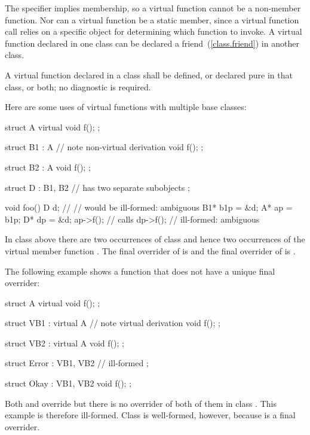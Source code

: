 \pnum
\begin{note}
The  specifier implies membership, so a virtual function
cannot be a non-member function. Nor can a virtual
function be a static member, since a virtual function call relies on a
specific object for determining which function to invoke. A virtual
function declared in one class can be declared a friend~(\ref{class.friend}) in
another class.
\end{note}

\pnum
{}%
A virtual function declared in a class shall be defined, or declared
pure in that class, or both; no diagnostic is
required.
%

\pnum
{}%
\begin{example}
Here are some uses of virtual functions with multiple base classes:
\begin{codeblock}
struct A {
  virtual void f();
};

struct B1 : A {                 // note non-virtual derivation
  void f();
};

struct B2 : A {
  void f();
};

struct D : B1, B2 {             //  has two separate  subobjects
};

void foo() {
  D   d;
//                  // would be ill-formed: ambiguous
  B1*  b1p = &d;
  A*   ap = b1p;
  D*   dp = &d;
  ap->f();                      // calls 
  dp->f();                      // ill-formed: ambiguous
}
\end{codeblock}
In class  above there are two occurrences of class 
and hence two occurrences of the virtual member function .
The final overrider of  is  and the final
overrider of  is .
\end{example}

\pnum
\begin{example}
The following example shows a function that does not have a unique final
overrider:
\begin{codeblock}
struct A {
  virtual void f();
};

struct VB1 : virtual A {        // note virtual derivation
  void f();
};

struct VB2 : virtual A {
  void f();
};

struct Error : VB1, VB2 {       // ill-formed
};

struct Okay : VB1, VB2 {
  void f();
};
\end{codeblock}
Both  and  override  but there
is no overrider of both of them in class . This example is
therefore ill-formed. Class  is well-formed, however,
because  is a final overrider.
\end{example}

